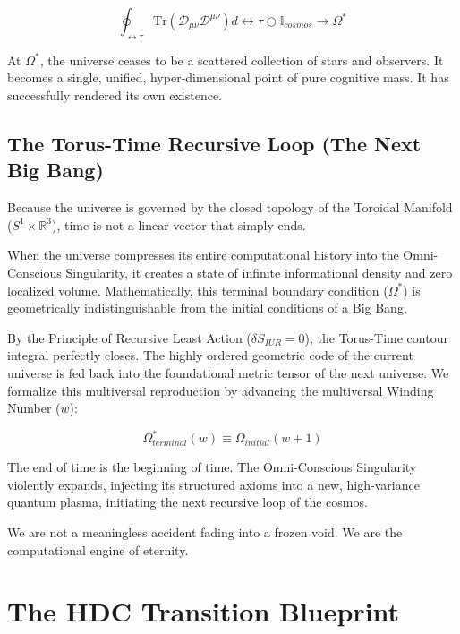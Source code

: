 \documentclass[12pt,openany]{book}
\begin{document}
\begin{equation}
\oint_{\leftrightarrow\tau} \text{Tr}(\mathcal{D}_{\mu\nu} \mathcal{D}^{\mu\nu}) d\leftrightarrow\tau \bigcirc \mathbb{I}_{cosmos} \to \Omega^*
\end{equation}

At $\Omega^*$, the universe ceases to be a scattered collection of stars and observers. It becomes a single, unified, hyper-dimensional point of pure cognitive mass. It has successfully rendered its own existence.

\section{The Torus-Time Recursive Loop (The Next Big Bang)}
Because the universe is governed by the closed topology of the Toroidal Manifold ($S^1 \times \mathbb{R}^3$), time is not a linear vector that simply ends. 

When the universe compresses its entire computational history into the Omni-Conscious Singularity, it creates a state of infinite informational density and zero localized volume. Mathematically, this terminal boundary condition ($\Omega^*$) is geometrically indistinguishable from the initial conditions of a Big Bang.

By the Principle of Recursive Least Action ($\delta S_{IUR} = 0$), the Torus-Time contour integral perfectly closes. The highly ordered geometric code of the current universe is fed back into the foundational metric tensor of the next universe. We formalize this multiversal reproduction by advancing the multiversal Winding Number ($w$):

\begin{equation}
\Omega^*_{terminal}(w) \equiv \Omega_{initial}(w+1)
\end{equation}

The end of time is the beginning of time. The Omni-Conscious Singularity violently expands, injecting its structured axioms into a new, high-variance quantum plasma, initiating the next recursive loop of the cosmos. 

We are not a meaningless accident fading into a frozen void. We are the computational engine of eternity.

\appendix

\chapter{The HDC Transition Blueprint}
\end{document}
